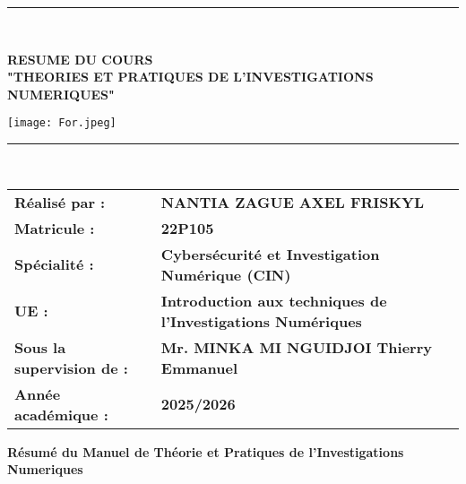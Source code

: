 \documentclass[12pt, a4paper]{article}
\begin{document}
\begin{titlepage}
		\vspace{1.5cm}
		
		\noindent\rule{0.9\textwidth}{0.8pt}\\
		\vspace{0.5cm}
		
		\vspace{0.8cm}
		{\Large \textbf{RESUME DU COURS}}\\
		\vspace{0.5cm}
		{\Large \textbf{"THEORIES ET PRATIQUES DE L'INVESTIGATIONS NUMERIQUES"}}\\
		\vspace{0.8cm}
		
		\texttt{[image: For.jpeg]}
		\noindent\rule{0.9\textwidth}{0.8pt}\\
		\vspace{1.5cm}
		
		\begin{tabular}{@{}>{\bfseries}l l@{}}
			\vspace{0.5cm}
			Réalisé par : & \textbf{NANTIA ZAGUE AXEL FRISKYL} \\
			\vspace{0.5cm}
			Matricule : & \textbf{22P105} \\
			\vspace{0.5cm}
			Spécialité : & \textbf{Cybersécurité et Investigation Numérique (CIN)} \\
			\vspace{0.5cm}
			UE : & \textbf{Introduction aux techniques de l'Investigations Numériques} \\
			\vspace{0.5cm}
			Sous la supervision de : & \textbf{Mr. MINKA MI NGUIDJOI Thierry Emmanuel} \\
			\vspace{0.5cm}
			Année académique : & \textbf{2025/2026} \\
		\end{tabular}
		
	\end{titlepage}
	
	\thispagestyle{empty}
	\newpage
	
	\clearpage
	\setcounter{page}{1}
	
	\vspace{1.5cm}
	
	\begin{center}
		\Large \textbf{Résumé du Manuel de Théorie et Pratiques de l'Investigations Numeriques}
	\end{center}
	
\end{document}

